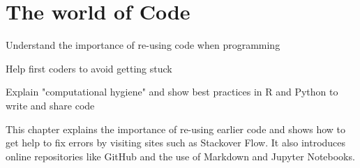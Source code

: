 \chapter{The world of Code}
\label{chap:worldcode}

\begin{abstract}{Abstract}
  
Programming is no longer a solitary activity, and almost all questions, problems, and error messages have been encountered and solved before. This chapter explains the most common forms of collaboration and sources of outside help, as well as giving best practices on how to write and share code yourself.
\end{abstract}


\begin{objectives}
\item Understand the importance of re-using code when programming
\item Help first coders to avoid getting stuck
\item Explain "computational hygiene" and show best practices in R and Python to write and share code
\end{objectives}

\begin{feature}
This chapter explains the importance of re-using earlier code and shows how to get help to fix errors by visiting sites such as Stackover Flow. It also introduces online repositories like GitHub and the use of Markdown and Jupyter Notebooks.
\end{feature}




